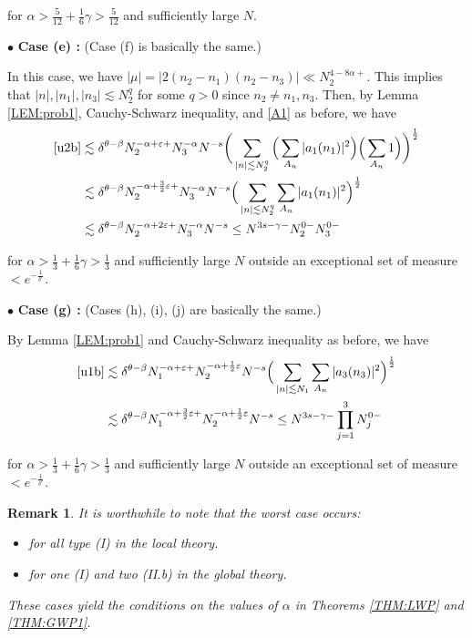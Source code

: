 \documentclass[11pt]{amsart}
\newtheorem{remark}[theorem]{Remark}
\numberwithin{equation}{section} \numberwithin{theorem}{section}
\begin{document}
{
\noindent} 
for ${\alpha} > \frac{5}{12}+\frac{1}{6}{\gamma} > \frac{5}{12}$
 and sufficiently large $N$.

\medskip

{
\noindent} $\bullet$ {\bf Case (e) :} (Case (f) is basically the same.)

In this case, we have $ |\mu| = |2 (n_2 - n_1) (n_2 - n_3)| \ll  N_2^{4-8{\alpha}+} $. 
This implies that $|n|, |n_1|, |n_3| \lesssim N_2^q$
for some $q> 0$ since $n_2 \ne n_1, n_3$.
Then, by Lemma \ref{LEM:prob1}, Cauchy-Schwarz inequality, and \eqref{A1} as before, 
we have
\begin{align*}
	\eqref{u2b} 
& \lesssim {\delta}^{\theta-\beta} 
	N_2^{-{\alpha}+{\varepsilon}+} N_3^{-{\alpha}} N^{-s}\bigg( \sum_{|n| \lesssim N_2^q} 
	\Big(\sum_{A_n} |a_1(n_1)|^2\Big) \Big(\sum_{A_n} 1\Big) \bigg)^\frac{1}{2} \\
& \lesssim {\delta}^{\theta-\beta} 
	N_2^{-{\alpha}+\frac{3}{2}{\varepsilon}+} N_3^{-{\alpha}} N^{-s}\Big( \sum_{|n| \lesssim N_2^q} \sum_{A_n} |a_1(n_1)|^2 \Big)^\frac{1}{2} \\
& \lesssim {\delta}^{\theta-\beta} N_2^{-{\alpha}+2{\varepsilon}+} N_3^{ -{\alpha}} N^{-s}
\leq N^{3s-{\gamma}-}N_2^{0-} N_3^{0-} 
\end{align*}

{
\noindent} for $ {\alpha} > \frac{1}{3} + \frac{1}{6}{\gamma}>\frac{1}{3}$ and sufficiently large $N$ outside an exceptional set of measure
$<e^{-\frac{1}{{\delta}^c}}$.

\medskip

{
\noindent} $\bullet$ {\bf Case (g) :} (Cases (h), (i), (j) are basically the same.)

By Lemma \ref{LEM:prob1} and Cauchy-Schwarz inequality as before,  we have
\begin{align*}
	\eqref{u1b} 
& \lesssim {\delta}^{\theta-\beta} 
	N_1^{-{\alpha}+{\varepsilon}+} N_2^{-{\alpha}+ \frac{1}{2}{\varepsilon}} N^{-s}\Big( \sum_{|n| \lesssim N_1} 
	\sum_{A_n} |a_3(n_3)|^2\Big)^\frac{1}{2} \\
& \lesssim {\delta}^{\theta-\beta} 
	N_1^{-{\alpha}+\frac{3}{2}{\varepsilon}+} N_2^{-{\alpha}+ \frac{1}{2}{\varepsilon}} N^{-s}
 \leq N^{3s-{\gamma}-}\prod_{j = 1}^3 N_j^{0-} 
\end{align*}

{
\noindent} for $ {\alpha} > \frac{1}{3} + \frac{1}{6}{\gamma}>\frac{1}{3}$ and sufficiently large $N$ outside an exceptional set of measure
$<e^{-\frac{1}{{\delta}^c}}$.

\begin{remark} \rm
It is worthwhile to note that 
the worst case occurs:
\begin{itemize}
\item for all type (I) in the local theory.
\item for one (I) and two (II.b) in the global theory.
\end{itemize}

{
\noindent}
These cases yield the conditions on the values of ${\alpha}$ in Theorems \ref{THM:LWP} and \ref{THM:GWP1}.

\end{remark}
\end{document}
